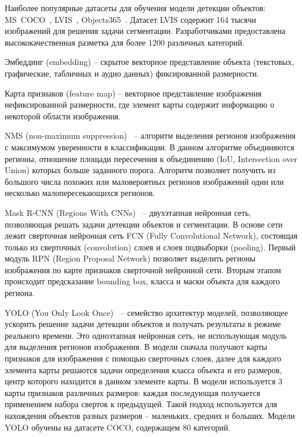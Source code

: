 \documentclass[a4paper,14pt]{article}
\begin{document}
    Наиболее популярные датасеты для обучения модели детекции объектов: MS~COCO~\cite{COCO}, LVIS~\cite{LVIS}, Objects365~\cite{Objects365}.
    Датасет LVIS содержит 164 тысячи изображений для решения задачи сегментации. Разработчиками предоставлена высококачественная разметка для более 1200 различных категорий.
    
    Эмбеддинг (embedding) -- скрытое векторное представление объекта (текстовых, графические, табличных и аудио данных) фиксированной размерности.

    Карта признаков (feature map) -- векторное представление изображения нефиксированной размерности, где элемент карты содержит информацию о некоторой области изображения.

    NMS (non-maximum suppression)~\cite{neubeck2006efficient} -- алгоритм выделения регионов изображения с максимумом уверенности в классификации.
    В данном алгоритме объединяются регионы, отношение площади пересечения к объединению (IoU, Intersection over Union) которых больше заданного порога.
    Алгоритм позволяет получить из большого числа похожих или маловероятных регионов изображений один или несколько малопересекающихся регионов.

    Mask R-CNN (Regions With CNNs)~\cite{MaskRCNN} -- двухэтапная нейронная сеть, позволяющая решать задачи детекции объектов и сегментации. В основе сети лежит сверточная нейронная сеть FCN (Fully Convolutional Network), состоящая только из сверточных (convolution) слоев и слоев подвыборки (pooling). Первый модуль RPN (Region Proposal Network) позволяет выделить регионы изображения по карте признаков сверточной нейронной сети. Вторым этапом происходит предсказание bounding box, класса и маски объекта для каждого региона.

    YOLO (You Only Look Once)~\cite{redmon2016you} -- семейство архитектур моделей, позволяющее ускорить решение задачи детекции объектов и получать результаты в режиме реального времени.
    Это одноэтапная нейронная сеть, не использующая модуль для выделения регионов изображения.
    В модели сначала получают карты признаков для изображения с помощью сверточных слоев, далее для каждого элемента карты решаются задачи определения класса объекта и его размеров, центр которого находится в данном элементе карты.
    В модели используется 3 карты признаков различных размеров: каждая последующая получается применением набора сверток к предыдущей.
    Такой подход используется для нахождения объектов разных размеров -- маленьких, средних и больших.
    Модели YOLO обучены на датасете COCO, содержащем 80 категорий.
\end{document}
